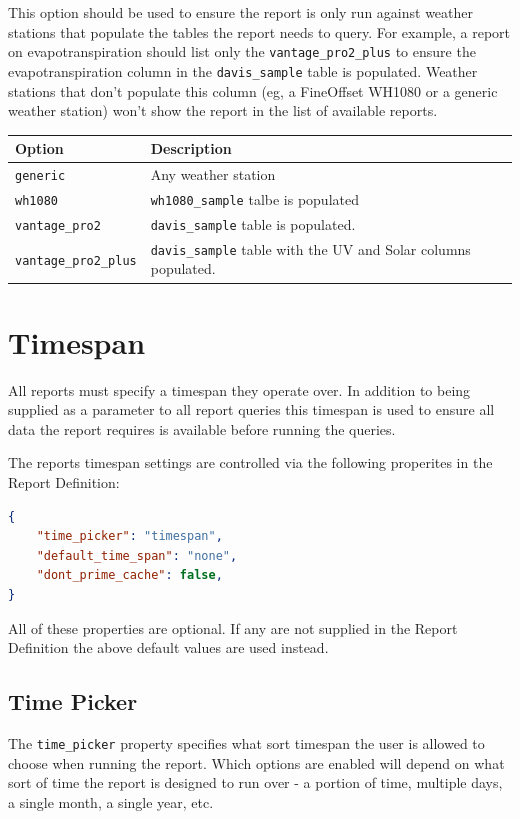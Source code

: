 \documentclass[a4paper,10pt]{book}
\begin{document}
This option should be used to ensure the report is only run against weather stations that populate the tables the report needs to query. For example, a report on evapotranspiration should list only the \verb|vantage_pro2_plus| to ensure the evapotranspiration column in the \verb|davis_sample| table is populated. Weather stations that don't populate this column (eg, a FineOffset WH1080 or a generic weather station) won't show the report in the list of available reports.

\begin{tabular}{p{3.3cm} l}
\hline
\textbf{Option} & \textbf{Description} \\
\hline
\verb|generic| & Any weather station \\
\verb|wh1080| & \verb|wh1080_sample| talbe is populated\\
\verb|vantage_pro2| & \verb|davis_sample| table is populated.\\
\verb|vantage_pro2_plus| & \verb|davis_sample| table with the UV and Solar columns populated.\\
\hline
\end{tabular}


\section{Timespan}
All reports must specify a timespan they operate over. In addition to being supplied as a parameter to all report queries this timespan is used to ensure all data the report requires is available before running the queries.

The reports timespan settings are controlled via the following properites in the Report Definition:
\begin{lstlisting}[language=json]
{
	"time_picker": "timespan",
	"default_time_span": "none",
	"dont_prime_cache": false,
}
\end{lstlisting}

All of these properties are optional. If any are not supplied in the Report Definition the above default values are used instead.

\subsection{Time Picker}
The \verb|time_picker| property specifies what sort timespan the user is allowed to choose when running the report. Which options are enabled will depend on what sort of time the report is designed to run over - a portion of time, multiple days, a single month, a single year, etc.
\end{document}

